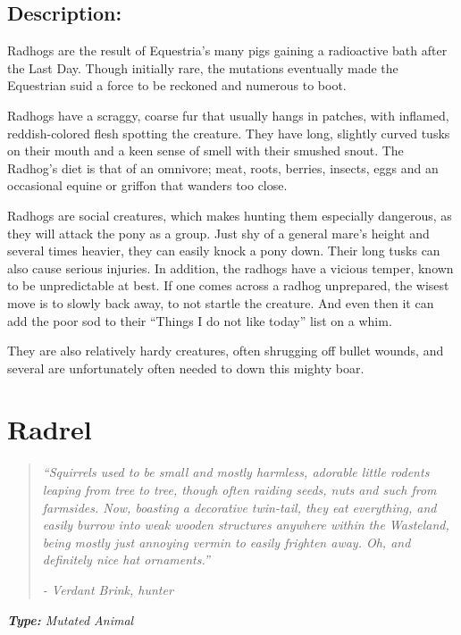 \documentclass[11pt,a4paper,twocolumn]{book}
\begin{document}
	
	
	
	\subsection*{Description:}
	Radhogs are the result of Equestria's many pigs gaining a radioactive bath after the Last Day. Though initially rare, the mutations eventually made the Equestrian suid a force to be reckoned and numerous to boot.
	
	Radhogs have a scraggy, coarse fur that usually hangs in patches, with inflamed, reddish-colored flesh spotting the creature. They have long, slightly curved tusks on their mouth and a keen sense of smell with their smushed snout. The Radhog's diet is that of an omnivore; meat, roots, berries, insects, eggs and an occasional equine or griffon that wanders too close.
	
	Radhogs are social creatures, which makes hunting them especially dangerous, as they will attack the pony as a group. Just shy of a general mare's height and several times heavier, they can easily knock a pony down. Their long tusks can also cause serious injuries. 
	In addition, the radhogs have a vicious temper, known to be unpredictable at best. If one comes across a radhog unprepared, the wisest move is to slowly back away, to not startle the creature. And even then it can add the poor sod to their ``Things I do not like today'' list on a whim.
	
	They are also relatively hardy creatures, often shrugging off bullet wounds, and several are unfortunately often needed to down this mighty boar.
	
	\clearpage
	
	\section*{Radrel}
	\begin{quote}
		\emph{``Squirrels used to be small and mostly harmless, adorable little rodents leaping from tree to tree, though often raiding seeds, nuts and such from farmsides. Now, boasting a decorative twin-tail, they eat everything, and easily burrow into weak wooden structures anywhere within the Wasteland, being mostly just annoying vermin to easily frighten away. Oh, and definitely nice hat ornaments.''}
		
		\emph{-	Verdant Brink, hunter}
	\end{quote}
	
	\emph{\textbf{Type:} Mutated Animal}
	
\end{document}
